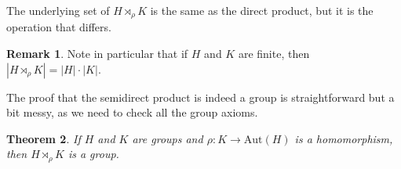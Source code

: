 \documentclass[12pt]{report}
\newtheorem{theorem}{Theorem}[chapter]
\numberwithin{equation}{section}
\numberwithin{theorem}{chapter}
\theoremstyle{definition}
\newtheorem*{basic properties}{Basic Properties}
\newtheorem*{Important Remark}{Important Remark}
\newtheorem{remark}[theorem]{Remark}
\def\sdp{\rtimes}
\begin{document}
The underlying set of $H \sdp_\rho K$ is the same as the direct product, but it is the operation that differs.
 
\begin{remark}
Note in particular that if $H$ and $K$ are finite, then $|H \sdp_\rho K| = |H| \cdot |K|$.
\end{remark}
 
  
 

 	
The proof that the semidirect product is indeed a group is straightforward but a bit messy, as we need to check all the group axioms.


\begin{theorem}\label{semidirect product}
If $H$ and $K$ are groups and $\rho\!: K \to \mathrm{Aut}(H)$ is a homomorphism, then $H \sdp_\rho K$ is a group.
\end{theorem}
\end{document}
